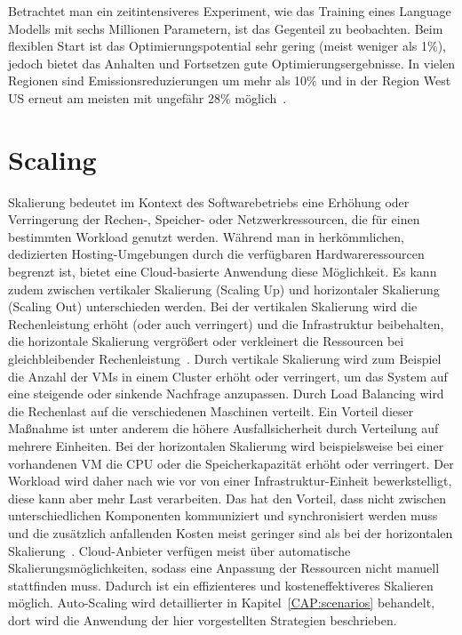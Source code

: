 Betrachtet man ein zeitintensiveres Experiment, wie das Training eines Language Modells mit sechs Millionen Parametern, ist das Gegenteil zu beobachten.
Beim flexiblen Start ist das Optimierungspotential sehr gering (meist weniger als 1\%), jedoch bietet das Anhalten und Fortsetzen gute Optimierungsergebnisse.
In vielen Regionen sind Emissionsreduzierungen um mehr als 10\% und in der Region West US erneut am meisten mit ungefähr 28\% möglich~\cite{Dodge.06212022}.

\section{Scaling}
Skalierung bedeutet im Kontext des Softwarebetriebs eine Erhöhung oder Verringerung der Rechen-, Speicher- oder Netzwerkressourcen, die für einen bestimmten Workload genutzt werden.
Während man in herkömmlichen, dedizierten Hosting-Umgebungen durch die verfügbaren Hardwareressourcen begrenzt ist, bietet eine Cloud-basierte Anwendung diese Möglichkeit.
Es kann zudem zwischen vertikaler Skalierung (Scaling Up) und horizontaler Skalierung (Scaling Out) unterschieden werden.
Bei der vertikalen Skalierung wird die Rechenleistung erhöht (oder auch verringert) und die Infrastruktur beibehalten, die horizontale Skalierung vergrößert oder verkleinert die Ressourcen bei gleichbleibender Rechenleistung~\cite{AlibabaCloudCommunity.20240118T09:19:15.000Z}.
Durch vertikale Skalierung wird zum Beispiel die Anzahl der \acp{VM} in einem Cluster erhöht oder verringert, um das System auf eine steigende oder sinkende Nachfrage anzupassen.
Durch Load Balancing wird die Rechenlast auf die verschiedenen Maschinen verteilt.
Ein Vorteil dieser Maßnahme ist unter anderem die höhere Ausfallsicherheit durch Verteilung auf mehrere Einheiten.
Bei der horizontalen Skalierung wird beispielsweise bei einer vorhandenen \ac{VM} die \ac{CPU} oder die Speicherkapazität erhöht oder verringert.
Der Workload wird daher nach wie vor von einer Infrastruktur-Einheit bewerkstelligt, diese kann aber mehr Last verarbeiten.
Das hat den Vorteil, dass nicht zwischen unterschiedlichen Komponenten kommuniziert und synchronisiert werden muss und die zusätzlich anfallenden Kosten meist geringer sind als bei der horizontalen Skalierung~\cite{Slingerland.2023}.
Cloud-Anbieter verfügen meist über automatische Skalierungsmöglichkeiten, sodass eine Anpassung der Ressourcen nicht manuell stattfinden muss.
Dadurch ist ein effizienteres und kosteneffektiveres Skalieren möglich.
Auto-Scaling wird detaillierter in Kapitel~\ref{CAP:scenarios} behandelt, dort wird die Anwendung der hier vorgestellten Strategien beschrieben.
